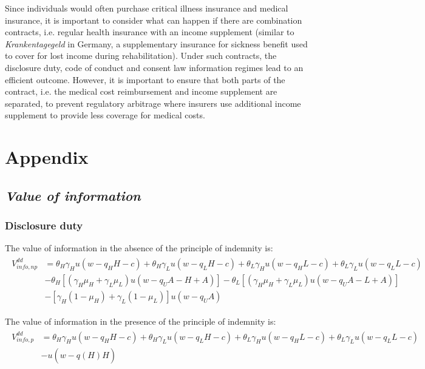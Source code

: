 \documentclass[natbib=false,preprint,12pt]{elsarticle}
\theoremstyle{plain}
\theoremstyle{definition}
\theoremstyle{plain}
\theoremstyle{TheoremNum}
\theoremstyle{CorollaryNum}
\theoremstyle{PropositionNum}
\theoremstyle{TheoremNum}
\begin{document}
Since individuals would often purchase critical illness insurance and medical insurance, it is important to consider what can happen if there are combination contracts, i.e. regular health insurance with an income supplement (similar to \textit{Krankentagegeld} in Germany, a supplementary insurance for sickness benefit used to cover for lost income during rehabilitation). Under such contracts, the disclosure duty, code of conduct and consent law information regimes lead to an efficient outcome. However, it is important to ensure that both parts of the contract, i.e. the medical cost reimbursement and income supplement are separated, to prevent regulatory arbitrage where insurers use additional income supplement to provide less coverage for medical costs. 

\newpage

\printbibliography[title = {References}]

\appendix
\section*{Appendix}

\subsection*{\emph{Value of information}}

\subsubsection*{Disclosure duty}

The value of information in the absence of the principle of indemnity is:
\begin{align}
\begin{split}
    V_{info,np}^{dd} & = \theta_H \gamma_H u(w-q_H H-c) + \theta_H \gamma_L u(w-q_L H-c) + \theta_L \gamma_H u(w-q_H L-c) + \theta_L \gamma_L u(w-q_L L-c) \\
    & - \theta_H [(\gamma_H \mu_H + \gamma_L \mu_L)u(w-q_U A - H + A)] - \theta_L [(\gamma_H \mu_H + \gamma_L \mu_L)u(w-q_U A - L + A)] \\
    & - [\gamma_H (1-\mu_H) + \gamma_L (1-\mu_L)]u(w-q_U A)
\end{split}
\end{align}

The value of information in the presence of the principle of indemnity is:
\begin{align}
\begin{split}
    V_{info,p}^{dd} & = \theta_H \gamma_H u(w-q_H H-c) + \theta_H \gamma_L u(w-q_L H-c) + \theta_L \gamma_H u(w-q_H L-c) + \theta_L \gamma_L u(w-q_L L-c) \\
    & - u(w-\widehat{q(H)}H)
\end{split}
\end{align}
\end{document}
